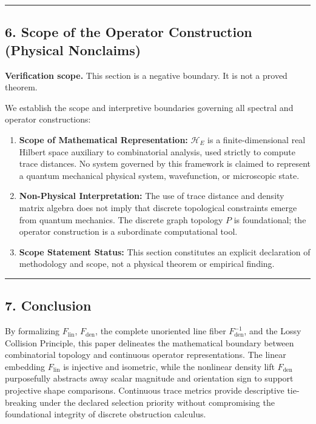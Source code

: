 \documentclass[
  10pt,
]{article}
\begin{document}
\begin{center}\rule{0.5\linewidth}{0.5pt}\end{center}

\subsection{6. Scope of the Operator Construction (Physical Nonclaims)}\label{scope-of-the-operator-construction-physical-nonclaims}

\textbf{Verification scope.} This section is a negative boundary. It is not a proved theorem.

We establish the scope and interpretive boundaries governing all spectral and operator constructions:

\begin{enumerate}
\def\labelenumi{\arabic{enumi}.}
\item
  \textbf{Scope of Mathematical Representation:} \protect\hypertarget{math-E0085-0196}{}{\(\mathcal{H}_E\)} is a finite-dimensional real Hilbert space auxiliary to combinatorial analysis, used strictly to compute trace distances. No system governed by this framework is claimed to represent a quantum mechanical physical system, wavefunction, or microscopic state.
\item
  \textbf{Non-Physical Interpretation:} The use of trace distance and density matrix algebra does not imply that discrete topological constraints emerge from quantum mechanics. The discrete graph topology \protect\hypertarget{math-E0156-0197}{}{\(P\)} is foundational; the operator construction is a subordinate computational tool.
\item
  \textbf{Scope Statement Status:} This section constitutes an explicit declaration of methodology and scope, not a physical theorem or empirical finding.
\end{enumerate}

\begin{center}\rule{0.5\linewidth}{0.5pt}\end{center}

\subsection{7. Conclusion}\label{conclusion}

By formalizing \protect\hypertarget{math-E0004-0198}{}{\(F_{\mathrm{lin}}\)}, \protect\hypertarget{math-E0003-0199}{}{\(F_{\mathrm{den}}\)}, the complete unoriented line fiber \protect\hypertarget{math-E0157-0200}{}{\(F_{\mathrm{den}}^{-1}\)}, and the Lossy Collision Principle, this paper delineates the mathematical boundary between combinatorial topology and continuous operator representations. The linear embedding \protect\hypertarget{math-E0004-0201}{}{\(F_{\mathrm{lin}}\)} is injective and isometric, while the nonlinear density lift \protect\hypertarget{math-E0003-0202}{}{\(F_{\mathrm{den}}\)} purposefully abstracts away scalar magnitude and orientation sign to support projective shape comparisons. Continuous trace metrics provide descriptive tie-breaking under the declared selection priority without compromising the foundational integrity of discrete obstruction calculus.
\end{document}
